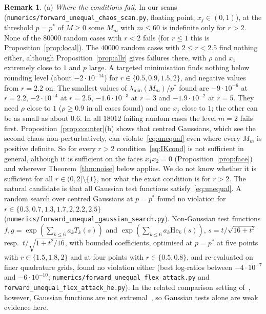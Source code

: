 \documentclass[11pt]{amsart}
\theoremstyle{definition}
\newtheorem{remark}[theorem]{Remark}
\begin{document}
\begin{remark}\label{rem:unequal}
(a) \emph{Where the conditions fail.} In our scans (\texttt{numerics/forward\_unequal\_chaos\_scan.py}, floating point,
$x_j\in(0,1)$), at the threshold $p=p^*$ of $M\ge0$ some $M_m$ with $m\le60$ is indefinite only for $r>2$. None of the
$80000$ random cases with $r<2$ fails (for $r\le1$ this is Proposition~\ref{prop:local}). The $40000$ random cases with
$2\le r<2.5$ find nothing either, although Proposition~\ref{prop:allr} gives failures there, with $\rho$ and $x_1$
extremely close to $1$ and $p$ large. A targeted minimisation finds nothing below rounding level (about $-2\cdot10^{-14}$)
for $r\in\{0.5,0.9,1.5,2\}$, and negative values from $r=2.2$ on. The smallest values of $\lambda_{\min}(M_m)/p^*$ found
are $-9\cdot10^{-6}$ at $r=2.2$, $-2\cdot10^{-4}$ at $r=2.5$, $-1.6\cdot10^{-3}$ at $r=3$ and $-1.9\cdot10^{-2}$ at $r=5$.
They need $\rho$ close to $1$ ($\rho\ge0.9$ in all cases found) and one $x_j$ close to $1$; the other can be as small as
about $0.6$. In all $18012$ failing random cases the level $m=2$ fails first. Proposition~\ref{prop:counter}(b) shows
that centred Gaussians, which see the second chaos non-perturbatively, can violate~\eqref{eq:unequal} even where every
$M_m$ is positive definite. So for every $r>2$ condition~\eqref{eq:IKcond} is not sufficient in general, although it is
sufficient on the faces $x_1x_2=0$ (Proposition~\ref{prop:face}) and wherever Theorem~\ref{thm:noise} below applies.
We do not know whether it is sufficient for all $r\in(0,2]\setminus\{1\}$, nor what the exact condition is for $r>2$. The natural candidate is that all Gaussian test
functions satisfy~\eqref{eq:unequal}. A random search over centred Gaussians at $p=p^*$ found no violation for
$r\in\{0.3,0.7,1.3,1.7,2,2.2,2.5\}$ (\texttt{numerics/forward\_unequal\_gaussian\_search.py}). Non-Gaussian test functions
$f,g=\exp(\sum_{k\le6}a_kT_k(s))$ and $\exp(\sum_{k\le6}a_k\mathrm{He}_k(s))$, $s=t/\sqrt{16+t^2}$ resp.\ $t/\sqrt{1+t^2/16}$,
with bounded coefficients, optimised at $p=p^*$ at five points with $r\in\{1.5,1.8,2\}$ and at four points with
$r\in\{0.5,0.8\}$, and re-evaluated on finer quadrature grids, found no violation either (best log-ratios between
$-4\cdot10^{-7}$ and $-6\cdot10^{-10}$;
\texttt{numerics/forward\_unequal\_flex\_attack.py} and \texttt{forward\_unequal\_flex\_attack\_he.py}). In the related comparison setting of~\cite{GC},
however, Gaussian functions are not extremal~\cite[Prop.~1.10]{GC}, so Gaussian tests alone are weak evidence here.


\end{remark}
\end{document}
